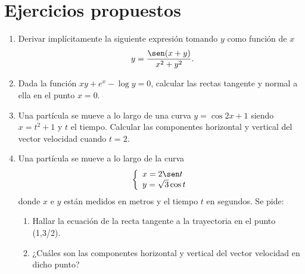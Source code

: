 \section{Ejercicios propuestos}
\begin{enumerate}[leftmargin=*]
\item Derivar implícitamente la siguiente expresión tomando $y$ como función de $x$
\[
\ y=\frac{\sen(x+y)}{x^{2}+y^{2}}.
\]
\item Dada la función $xy+e^{x}-\log{y}=0$, calcular las rectas tangente y normal a ella en el punto $x=0$.

\item Una partícula se mueve a lo largo de una curva $y=\cos{2x+1}$ siendo $x=t^2+1$ y $t$ el tiempo. Calcular las componentes horizontal y vertical del vector velocidad cuando $t=2$.

\item  Una partícula se mueve a lo largo de la curva
\[\left\{
\begin{array}{l}
x=2\sen t\\
y=\sqrt{3}\cos{t}
\end{array}
\right.
\]
donde $x$ e $y$ están medidos en metros y el tiempo $t$ en segundos.
Se pide:
\begin{enumerate}
\item Hallar la ecuación de la recta tangente a la trayectoria en el punto (1,3/2).
\item ¿Cuáles son las componentes horizontal y vertical del vector velocidad en dicho punto?
\end{enumerate}
\end{enumerate}












